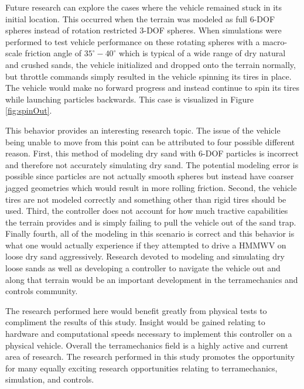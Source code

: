 \documentclass[12pt,onecolumn]{report}
\begin{document}
Future research can explore the cases where the vehicle remained stuck in its initial location. This occurred when the terrain was modeled as full 6-DOF spheres instead of rotation restricted 3-DOF spheres. When simulations were performed to test vehicle performance on these rotating spheres with a macro-scale friction angle of $35^\circ-40^\circ$ which is typical of a wide range of dry natural and crushed sands, the vehicle initialized and dropped onto the terrain normally, but throttle commands simply resulted in the vehicle spinning its tires in place. The vehicle would make no forward progress and instead continue to spin its tires while launching particles backwards. This case is visualized in Figure \ref{fig:spinOut}. 

This behavior provides an interesting research topic. The issue of the vehicle being unable to move from this point can be attributed to four possible different reason. First, this method of modeling dry sand with 6-DOF particles is incorrect and therefore not accurately simulating dry sand. The potential modeling error is possible since particles are not actually smooth spheres but instead have coarser jagged geometries which would result in more rolling friction. Second, the vehicle tires are not modeled correctly and something other than rigid tires should be used. Third, the controller does not account for how much tractive capabilities the terrain provides and is simply failing to pull the vehicle out of the sand trap. Finally fourth, all of the modeling in this scenario is correct and this behavior is what one would actually experience if they attempted to drive a HMMWV on loose dry sand aggressively. Research devoted to modeling and simulating dry loose sands as well as developing a controller to navigate the vehicle out and along that terrain would be an important development in the terramechanics and controls community. 

The research performed here would benefit greatly from physical tests to compliment the results of this study. Insight would be gained relating to hardware and computational speeds necessary to implement this controller on a physical vehicle. Overall the terramechanics field is a highly active and current area of research. The research performed in this study promotes the opportunity for many equally exciting research opportunities relating to terramechanics, simulation, and controls.


\newpage
\titlespacing{\chapter}{0in}{-20pt}{0.2in}
\end{document}
